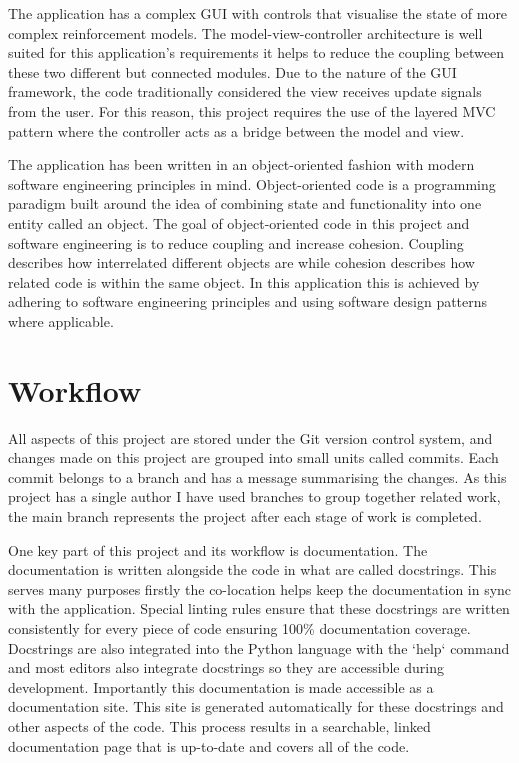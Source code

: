 \documentclass[]{final_report}
\begin{document}
The application has a complex GUI with controls that visualise the state of more complex reinforcement models. The model-view-controller architecture is well suited for this application's requirements it helps to reduce the coupling between these two different but connected modules. Due to the nature of the GUI framework, the code traditionally considered the view receives update signals from the user. For this reason, this project requires the use of the layered MVC pattern \cite{webMVC}\cite{gamesMVC} where the controller acts as a bridge between the model and view.

The application has been written in an object-oriented fashion with modern software engineering principles in mind\cite{van2008software}. Object-oriented code is a programming paradigm built around the idea of combining state and functionality into one entity called an object. The goal of object-oriented code in this project and software engineering is to reduce coupling and increase cohesion. Coupling describes how interrelated different objects are while cohesion describes how related code is within the same object. In this application this is achieved by adhering to software engineering principles \cite{softwareEngineringPrinciples} and using software design patterns where applicable.


\section{Workflow}


All aspects of this project are stored under the Git version control system, and changes made on this project are grouped into small units called commits. Each commit belongs to a branch and has a message summarising the changes. As this project has a single author I have used branches to group together related work, the main branch represents the project after each stage of work is completed. 

One key part of this project and its workflow is documentation. The documentation is written alongside the code in what are called docstrings. This serves many purposes firstly the co-location helps keep the documentation in sync with the application. Special linting rules ensure that these docstrings are written consistently for every piece of code ensuring 100\% documentation coverage. Docstrings are also integrated into the Python language with the `help` command and most editors also integrate docstrings so they are accessible during development. Importantly this documentation is made accessible as a documentation site. This site is generated automatically for these docstrings and other aspects of the code. This process results in a searchable, linked documentation page that is up-to-date and covers all of the code. 
\end{document}
